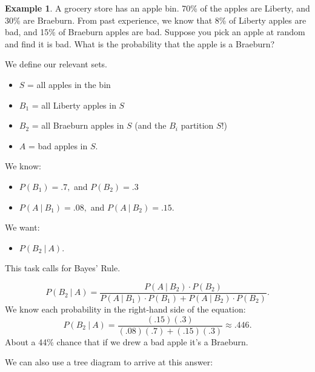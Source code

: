 \documentclass[
]{book}
\providecommand{\tightlist}{%
  \setlength{\itemsep}{0pt}\setlength{\parskip}{0pt}}
\theoremstyle{definition}
\theoremstyle{definition}
\newtheorem{example}{Example}[chapter]
\theoremstyle{definition}
\theoremstyle{definition}
\theoremstyle{remark}
\begin{document}
\begin{example}
\protect\hypertarget{exm:bad-apples}{}\label{exm:bad-apples}A grocery store has an apple bin. 70\% of the apples are Liberty, and 30\% are Braeburn. From past experience, we know that 8\% of Liberty apples are bad, and 15\% of Braeburn apples are bad. Suppose you pick an apple at random and find it is bad. What is the probability that the apple is a Braeburn?

We define our relevant sets.

\begin{itemize}
\tightlist
\item
  \(S\) = all apples in the bin
\item
  \(B_1\) = all Liberty apples in \(S\)
\item
  \(B_2\) = all Braeburn apples in \(S\) (and the \(B_i\) partition \(S\)!)
\item
  \(A\) = bad apples in \(S\).
\end{itemize}

We know:

\begin{itemize}
\tightlist
\item
  \(P(B_1) = .7,\) and \(P(B_2) = .3\)
\item
  \(P(A~|~B_1) = .08,\) and \(P(A~|~B_2) = .15\).
\end{itemize}

We want:

\begin{itemize}
\tightlist
\item
  \(P(B_2 ~|~ A)\).
\end{itemize}

This task calls for Bayes' Rule.

\[P(B_2~|~A) = \frac{P(A~|~B_2)\cdot P(B_2)}{P(A~|~B_1)\cdot P(B_1)+P(A~|~B_2)\cdot P(B_2)}.\]
We know each probability in the right-hand side of the equation:
\[P(B_2~|~A) = \frac{(.15)(.3)}{(.08)(.7)+(.15)(.3)} \approx .446.\]
About a 44\% chance that if we drew a bad apple it's a Braeburn.

We can also use a tree diagram to arrive at this answer:


\end{example}
\end{document}
